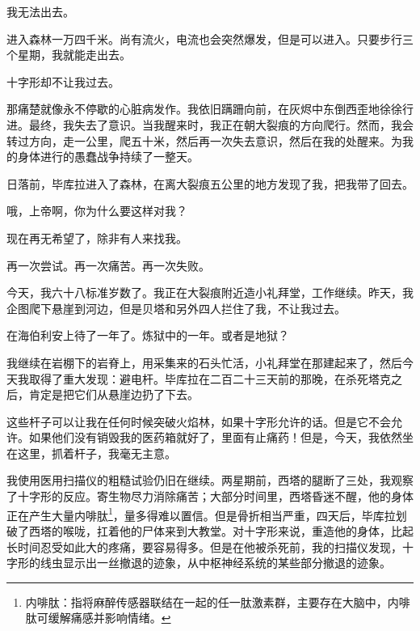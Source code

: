 \documentclass[AutoFakeBold=true]{book}
\begin{document}
\vspace*{1em}{\kaishu 第二百一十五日：}

我无法出去。

进入森林一万四千米。尚有流火，电流也会突然爆发，但是可以进入。只要步行三个星期，我就能走出去。

十字形却不让我过去。

那痛楚就像永不停歇的心脏病发作。我依旧蹒跚向前，在灰烬中东倒西歪地徐徐行进。最终，我失去了意识。当我醒来时，我正在朝大裂痕的方向爬行。然而，我会转过方向，走一公里，爬五十米，然后再一次失去意识，然后在我的处醒来。为我的身体进行的愚蠢战争持续了一整天。

日落前，毕库拉进入了森林，在离大裂痕五公里的地方发现了我，把我带了回去。

哦，上帝啊，你为什么要这样对我？

现在再无希望了，除非有人来找我。

\vspace*{1em}{\kaishu 第二百二十三日：}

再一次尝试。再一次痛苦。再一次失败。

\vspace*{1em}{\kaishu 第二百五十七日：}

今天，我六十八标准岁数了。我正在大裂痕附近造小礼拜堂，工作继续。昨天，我企图爬下悬崖到河边，但是贝塔和另外四人拦住了我，不让我过去。

\vspace*{1em}{\kaishu 第二百八十日：}

在海伯利安上待了一年了。炼狱中的一年。或者是地狱？

\vspace*{1em}{\kaishu 第三百一十一日：}

我继续在岩棚下的岩脊上，用采集来的石头忙活，小礼拜堂在那建起来了，然后今天我取得了重大发现：避电杆。毕库拉在二百二十三天前的那晚，在杀死塔克之后，肯定是把它们从悬崖边扔了下去。

这些杆子可以让我在任何时候突破火焰林，如果十字形允许的话。但是它不会允许。如果他们没有销毁我的医药箱就好了，里面有止痛药！但是，今天，我依然坐在这里，抓着杆子，我毫无主意。

我使用医用扫描仪的粗糙试验仍旧在继续。两星期前，西塔的腿断了三处，我观察了十字形的反应。寄生物尽力消除痛苦；大部分时间里，西塔昏迷不醒，他的身体正在产生大量内啡肽\footnote{内啡肽：指将麻醉传感器联结在一起的任一肽激素群，主要存在大脑中，内啡肽可缓解痛感并影响情绪。}，量多得难以置信。但是骨折相当严重，四天后，毕库拉划破了西塔的喉咙，扛着他的尸体来到大教堂。对十字形来说，重造他的身体，比起长时间忍受如此大的疼痛，要容易得多。但是在他被杀死前，我的扫描仪发现，十字形的线虫显示出一丝撤退的迹象，从中枢神经系统的某些部分撤退的迹象。
\end{document}
